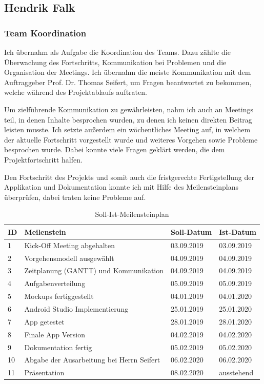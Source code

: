 \clearpage

\subsection{Hendrik Falk}

\subsubsection{Team Koordination}

Ich übernahm als Aufgabe die Koordination des Teams. Dazu zählte die Überwachung des Fortschritts, Kommunikation bei Problemen und die Organisation der Meetings. Ich übernahm die meiste Kommunikation mit dem Auftraggeber Prof. Dr. Thomas Seifert, um Fragen beantwortet zu bekommen, welche während des Projektablaufs auftraten. 

Um zielführende Kommunikation zu gewährleisten, nahm ich auch an Meetings teil, in denen Inhalte besprochen wurden, zu denen ich keinen direkten Beitrag leisten musste. Ich setzte außerdem ein wöchentliches Meeting auf, in welchem der aktuelle Fortschritt vorgestellt wurde und weiteres Vorgehen sowie Probleme besprochen wurde. Dabei konnte viele Fragen geklärt werden, die dem Projektfortschritt halfen. 

Den Fortschritt des Projekts und somit auch die fristgerechte Fertigstellung der Applikation und Dokumentation konnte ich mit Hilfe des Meilensteinplans überprüfen, dabei traten keine Probleme auf. 

\vspace{1em}

\begin{table}[!h]
\begin{tabularx}{\textwidth}{|p{1em}|X|p{5em}|p{5em}|}
	\hline
	\textbf{ID}	& \textbf{Meilenstein} & \textbf{Soll-Datum} & \textbf{Ist-Datum} \\
	\hline	\hline
	1	& Kick-Off Meeting abgehalten & 03.09.2019 & 03.09.2019 \\
	\hline
	2	& Vorgehensmodell ausgewählt & 04.09.2019	& 04.09.2019 \\
	\hline
	3	& Zeitplanung (GANTT) und Kommunikation	& 04.09.2019	& 04.09.2019 \\
	\hline
	4	& Aufgabenverteilung	& 05.09.2019	& 05.09.2019 \\
	\hline
	5	& Mockups fertiggestellt	& 04.01.2019	& 04.01.2020 \\
	\hline
	6	& Android Studio Implementierung	& 25.01.2019	& 25.01.2020 \\
	\hline
	7	& App getestet	& 28.01.2019	& 28.01.2020  \\
	\hline
	8	& Finale App Version	& 04.02.2019	& 04.02.2020 \\
	\hline
	9	& Dokumentation fertig	& 05.02.2019	& 05.02.2020 \\
	\hline
	10	& Abgabe der Ausarbeitung bei Herrn Seifert	& 06.02.2020	& 06.02.2020 \\
	\hline
	11	& Präsentation	& 08.02.2020	& ausstehend \\
	\hline
\end{tabularx}
\caption{Soll-Ist-Meilensteinplan}
\end{table}

